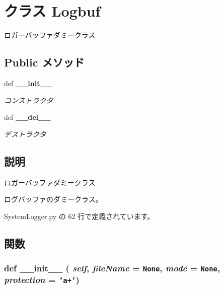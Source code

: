 \section{クラス Logbuf}
\label{classsource__py_1_1_system_logger_1_1_logbuf}
ロガーバッファダミークラス  


\subsection*{Public メソッド}
\begin{CompactItemize}
\item 
def {\bf \_\-\_\-init\_\-\_\-}
\begin{CompactList}\small\item\em コンストラクタ \item\end{CompactList}\item 
def {\bf \_\-\_\-del\_\-\_\-}
\begin{CompactList}\small\item\em デストラクタ \item\end{CompactList}\end{CompactItemize}


\subsection{説明}
ロガーバッファダミークラス 

ログバッファのダミークラス。 

 SystemLogger.py の 62 行で定義されています。

\subsection{関数}
\subsubsection{\setlength{\rightskip}{0pt plus 5cm}def \_\-\_\-init\_\-\_\- ( {\em self},  {\em fileName} = {\tt None},  {\em mode} = {\tt None},  {\em protection} = {\tt 'a+'})}\label{classsource__py_1_1_system_logger_1_1_logbuf_c775ee34451fdfa742b318538164070e}


